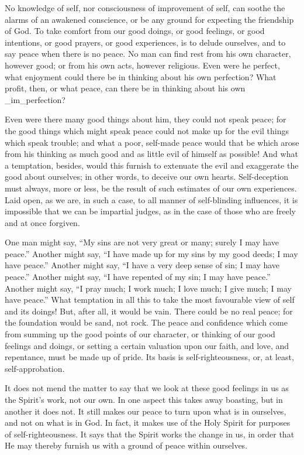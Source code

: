 \documentclass[
]{book}
\begin{document}
No knowledge of self, nor consciousness of improvement of self, can soothe the alarms of an awakened conscience, or be any ground for expecting the friendship of God. To take comfort from our good doings, or good feelings, or good intentions, or good prayers, or good experiences, is to delude ourselves, and to say peace when there is no peace. No man can find rest from his own character, however good; or from his own acts, however religious. Even were he perfect, what enjoyment could there be in thinking about his own perfection? What profit, then, or what peace, can there be in thinking about his own \_im\_perfection?

Even were there many good things about him, they could not speak peace; for the good things which might speak peace could not make up for the evil things which speak trouble; and what a poor, self-made peace would that be which arose from his thinking as much good and as little evil of himself as possible! And what a temptation, besides, would this furnish to extenuate the evil and exaggerate the good about ourselves; in other words, to deceive our own hearts. Self-deception must always, more or less, be the result of such estimates of our own experiences. Laid open, as we are, in such a case, to all manner of self-blinding influences, it is impossible that we can be impartial judges, as in the case of those who are freely and at once forgiven.

One man might say, ``My sins are not very great or many; surely I may have peace.'' Another might say, ``I have made up for my sins by my good deeds; I may have peace.'' Another might say, ``I have a very deep sense of sin; I may have peace.'' Another might say, ``I have repented of my sin; I may have peace.'' Another might say, ``I pray much; I work much; I love much; I give much; I may have peace.'' What temptation in all this to take the most favourable view of self and its doings! But, after all, it would be vain. There could be no real peace; for the foundation would be sand, not rock. The peace and confidence which come from summing up the good points of our character, or thinking of our good feelings and doings, or setting a certain valuation upon our faith, and love, and repentance, must be made up of pride. Its basis is self-righteousness, or, at least, self-approbation.

It does not mend the matter to say that we look at these good feelings in us as the Spirit's work, not our own. In one aspect this takes away boasting, but in another it does not. It still makes our peace to turn upon what is in ourselves, and not on what is in God. In fact, it makes use of the Holy Spirit for purposes of self-righteousness. It says that the Spirit works the change in us, in order that He may thereby furnish us with a ground of peace within ourselves.
\end{document}
